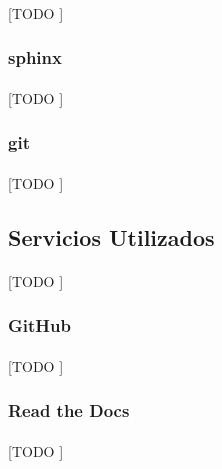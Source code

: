 \documentclass{subfiles}
\begin{document}
          \paragraph{}
          [TODO ]

        \subsubsection{sphinx}
        \label{sec:sphinx}

          \paragraph{}
          [TODO ]

        \subsubsection{git}
        \label{sec:git}

          \paragraph{}
          [TODO ]

      \subsection{Servicios Utilizados}
      \label{sec:used_services}

        \paragraph{}
        [TODO ]

        \subsubsection{GitHub}
        \label{sec:github}

          \paragraph{}
          [TODO ]

        \subsubsection{Read the Docs}
        \label{sec:readthedocs}

          \paragraph{}
          [TODO ]
\end{document}
